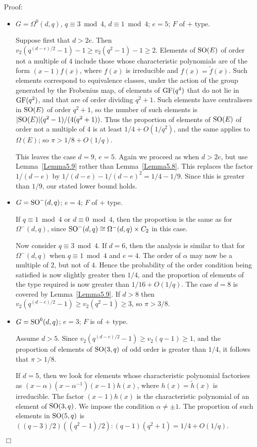 \documentclass[12pt]{article}
\newenvironment{proof}{\normalsize {\sc Proof}:}{{\hfill $\Box$ \\}}
\def\SO{{\rm SO}}
\def\Oh{O}  %
\def\GF{{\rm GF}}
\begin{document}
\begin{proof}
\begin{itemize}
\item 
$G=\Omega^0(d,q)$, $q\equiv3\bmod4$, $d\equiv1\bmod4$; 
$e=5$; $F$ of $+$ type.

Suppose first that $d>2e$.  Then $v_2(q^{(d-e)/2}-1)-1\ge v_2(q^2-1)-1\ge2$.
Elements of $\SO(E)$ of order not a multiple of $4$ include
those whose characteristic polynomials are of the form $(x-1)f(x)$,
where $f(x)$ is irreducible and $f(x)=\tilde{f}(x)$.  
Such elements correspond to
equivalence classes, under the action of the group generated 
by the Frobenius map, of
elements of $\GF(q^4)$ that do not lie in $\GF(q^2)$, and that 
are of order dividing
$q^2+1$.  Such elements have centralisers in $\SO(E)$ of order $q^2+1$, so
the number of such elements is $|\SO(E)|(q^2-1)/(4(q^2+1))$.
Thus the proportion of elements of $\SO(E)$ of order not a multiple of $4$ is
at least $1/4 + \Oh(1/q^2)$, and the same applies to $\Omega(E)$;
so $\pi>1/8+\Oh(1/q)$.

This leaves the case $d=9$, $e=5$.  Again we proceed as when
$d>2e$, but use Lemma~\ref{Lemma5.9} rather than Lemma~\ref{Lemma5.8}.  
This replaces the factor $1/(d-e)$ by $1/(d-e)-1/(d-e)^2=1/4-1/9$.  Since
this is greater than $1/9$, our stated lower bound holds.

\item 
$G=\SO^-(d,q)$; $e=4$; $F$ of $+$ type.  
 
If $q\equiv1\bmod4$ or $d\equiv0\bmod 4$, then the proportion is  
the same as for $\Omega^-(d,q)$, since $\SO^-(d,q)\cong\Omega^-(d,q)
\times C_2$ in this case.

Now consider $q \equiv 3\bmod 4$.
If $d=6$, then the analysis is similar to that for $\Omega^-(d,q)$ when
$q\equiv 1\bmod 4$ and $e=4$.  
The order of $\alpha$ may now be a multiple of $2$,
but not of $4$. Hence the probability of the order condition being
satisfied is now slightly greater then $1/4$, and the proportion
of elements of the type required is now greater than $1/16 +\Oh(1/q)$.
The case $d=8$ is covered by Lemma~\ref{Lemma5.9}.
If $d>8$ then $v_2(q^{(d-e)/2}-1)\ge v_2(q^2-1)\ge3$, so $\pi>3/8$.

\item 
$G=\SO^0(d,q)$; $e=3$; $F$ is of $+$ type.

Assume $d > 5$.  Since $v_2(q^{(d-e)/2}-1)\ge v_2(q-1)\ge1$, and the
proportion of elements of $\SO(3,q)$ of odd order is greater than
$1/4$, it follows that $\pi>1/8$.

If $d=5$, then we look for elements whose characteristic polynomial 
factorises
as $(x-\alpha)(x-\alpha^{-1})(x-1)h(x)$, where $h(x)=\tilde{h}(x)$ is
irreducible.  The factor $(x-1)h(x)$ is the characteristic polynomial
of an element of $\SO(3,q)$.  We impose the condition $\alpha\ne \pm1$.
The proportion of such elements in $\SO(5,q)$ is 
$((q-3)/2)((q^2-1)/2):(q-1)(q^2+1)=1/4+\Oh(1/q)$.
\end{itemize}
\vspace*{-1cm}
\end{proof}
\end{document}
